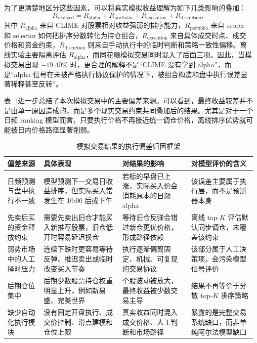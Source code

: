为了更清楚地区分这些因素，可以将真实模拟收益理解为如下几类影响的叠加：
\begin{equation}
    R_{\mathrm{realized}}
    =
    R_{\mathrm{alpha}}
    +
    R_{\mathrm{portfolio}}
    +
    R_{\mathrm{execution}}
    +
    R_{\mathrm{discretion}},
\end{equation}
其中 $R_{\mathrm{alpha}}$ 来自 CLIME 对股票相对收益强弱的排序能力，$R_{\mathrm{portfolio}}$ 来自 scorer 和 selector 如何把排序分数转化为持仓组合，$R_{\mathrm{execution}}$ 来自具体成交时点、成交价格和资金约束，$R_{\mathrm{discretion}}$ 则来自手动执行中的临时判断和策略一致性偏移。离线实验主要隔离评估 $R_{\mathrm{alpha}}$，而同花顺模拟交易同时混入了后面三项。因此，当模拟交易出现 $-19.40\%$ 时，更合理的解释不是“CLIME 没有学到 alpha”，而是“alpha 信号在未被严格执行协议保护的情况下，被组合构造和盘中执行误差显著稀释甚至反转”。

表~\ref{tab:execution_gap_framework}进一步总结了本次模拟交易中的主要偏差来源。可以看到，最终收益较差并不是由单一原因造成的，而是多个现实交易约束共同叠加后的结果。尤其是对于一个日频 ranking 模型而言，只要执行价格不再接近统一调仓价格，离线排序优势就可能被日内价格路径显著削弱。

\begin{table}[H]
    \centering
    \caption{模拟交易结果的执行偏差归因框架}
    \label{tab:execution_gap_framework}
    \footnotesize
    \begin{tabular}{@{}p{}p{}p{}p{}@{}}
        \toprule
        偏差来源 & 具体表现 & 对结果的影响 & 对模型评价的含义 \\
        \midrule
        日频预测与盘中执行不一致 &
        模型预测下一交易日收益排序，但实际买入常发生在 10:00 后或下午 &
        若标的早盘已上涨，实际买入价会消耗原本的日频 alpha &
        该误差主要属于执行层，而不是预测器本身 \\
        \midrule
        先卖后买的资金释放约束 &
        需要先卖出旧仓才能买入新推荐股票，旧仓低开时容易延迟换仓 &
        等待旧仓反弹会错过新仓更优价格，形成路径依赖 &
        离线 top-$K$ 评估默认同步调仓，未覆盖该约束 \\
        \midrule
        弱势市场中的人工择时压力 &
        连续下跌时更容易等待反弹、推迟卖出或临时改变买入节奏 &
        执行逐渐偏离固定、机械、可复现的交易协议 &
        该部分属于人工决策项，会污染模型信号评价 \\
        \midrule
        后期仓位集中 &
        后期少数股票持仓权重明显上升，例如新易盛、完美世界 &
        个股波动被放大，最终收益被少数交易主导 &
        结果不再等价于分散 top-$K$ 排序策略 \\
        \midrule
        缺少自动化执行模块 &
        没有固定开盘执行、成交价控制、滑点建模和仓位上限 &
        真实收益同时混入成交价格、人工判断和市场路径 &
        暴露的是完整交易系统缺口，而非单纯阿尔法模型缺口 \\
        \bottomrule
    \end{tabular}
\end{table}

